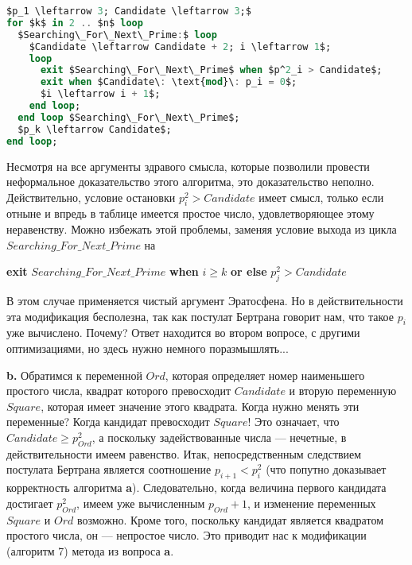 \documentclass{mai_book}
\begin{document}
\begin{lstlisting}[mathescape=true, language=Ada, caption=Генерация простых чисел]
$p_1 \leftarrow 3; Candidate \leftarrow 3;$
for $k$ in 2 .. $n$ loop
  $Searching\_For\_Next\_Prime:$ loop
    $Candidate \leftarrow Candidate + 2; i \leftarrow 1$;
    loop
      exit $Searching\_For\_Next\_Prime$ when $p^2_i > Candidate$;
      exit when $Candidate\: \text{mod}\: p_i = 0$;
      $i \leftarrow i + 1$;
    end loop;
  end loop $Searching\_For\_Next\_Prime$;
  $p_k \leftarrow Candidate$;
end loop;
\end{lstlisting}

Несмотря на все аргументы здравого смысла, которые позволили
провести неформальное доказательство этого алгоритма, это доказательство
неполно. Действительно, условие остановки $p^2_i > Candidate$ имеет смысл, только если отныне и впредь в таблице имеется простое число, удовлетворяющее этому неравенству. Можно избежать этой проблемы, заменяя условие выхода из цикла $Searching\_For\_Next\_Prime$ на\newline

\textbf{exit} $Searching\_For\_Next\_Prime$ \textbf{when} $i \geqslant k$ \textbf{or else} $p^2_j > Candidate$\newline

В этом случае применяется чистый аргумент Эратосфена. Но в действительности
эта модификация бесполезна, так как постулат Бертрана говорит нам,
что такое $p_i$ уже вычислено. Почему? Ответ находится во втором вопросе,
с другими оптимизациями, но здесь нужно немного поразмышлять...
\newpage

\textbf{b.} Обратимся к переменной $Ord$, которая определяет номер наименьшего простого числа,
квадрат которого превосходит $Candidate$ и вторую переменную $Square$, которая имеет
значение этого квадрата. Когда нужно менять эти переменные? Когда кандидат
превосходит $Square$! Это означает, что $Candidate \geqslant p^2_{Ord}$, а поскольку задействованные
числа — нечетные, в действительности имеем равенство. Итак, непосредственным следствием
постулата Бертрана является соотношение $p_{i+1} < p^2_i$ (что попутно доказывает корректность алгоритма \textbf{a}).
Следовательно, когда величина первого кандидата достигает $p^2_{Ord}$, имеем уже вычисленным $p_{Ord} + 1$,
и изменение переменных $Square$ и $Ord$ возможно. Кроме того, поскольку кандидат является
квадратом простого числа, он — непростое число. Это приводит нас к модификации (алгоритм 7) метода из вопроса \textbf{a}.
\end{document}
